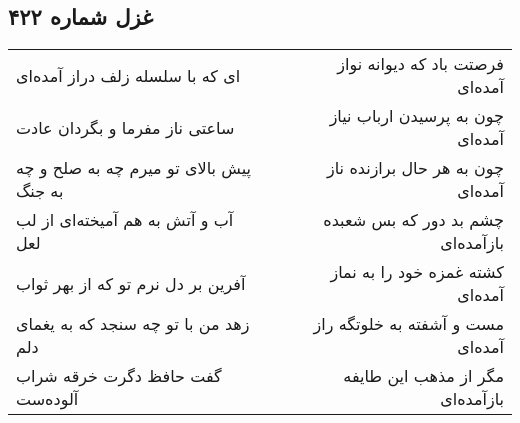 \begin{center}
\section*{غزل شماره ۴۲۲}
\label{sec:sh422}
\begin{longtable}{l p{0.5cm} r}
ای که با سلسله زلف دراز آمده‌ای
&&
فرصتت باد که دیوانه نواز آمده‌ای
\\
ساعتی ناز مفرما و بگردان عادت
&&
چون به پرسیدن ارباب نیاز آمده‌ای
\\
پیش بالای تو میرم چه به صلح و چه به جنگ
&&
چون به هر حال برازنده ناز آمده‌ای
\\
آب و آتش به هم آمیخته‌ای از لب لعل
&&
چشم بد دور که بس شعبده بازآمده‌ای
\\
آفرین بر دل نرم تو که از بهر ثواب
&&
کشته غمزه خود را به نماز آمده‌ای
\\
زهد من با تو چه سنجد که به یغمای دلم
&&
مست و آشفته به خلوتگه راز آمده‌ای
\\
گفت حافظ دگرت خرقه شراب آلوده‌ست
&&
مگر از مذهب این طایفه بازآمده‌ای
\\
\end{longtable}
\end{center}
